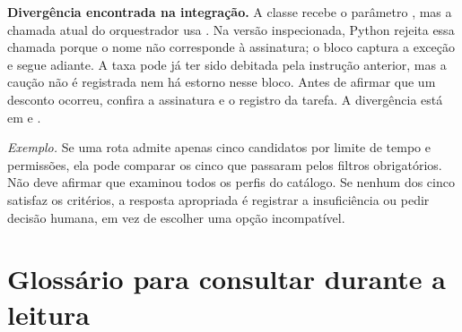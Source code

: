 \clearpage
\begin{aviso}
\textbf{Divergência encontrada na integração.} A classe
 recebe o parâmetro , mas a chamada atual do
orquestrador usa . Na versão inspecionada, Python rejeita essa
chamada porque o nome não corresponde à assinatura; o bloco captura a exceção e
segue adiante. A taxa pode já ter sido debitada pela instrução anterior, mas a
caução não é registrada nem há estorno nesse bloco. Antes de afirmar que um
desconto ocorreu, confira a assinatura e o registro da tarefa. A divergência está em
 e .
\end{aviso}

\noindent\textit{Exemplo.} Se uma rota admite apenas cinco candidatos por limite de tempo e permissões, ela pode comparar os cinco que passaram pelos filtros obrigatórios. Não deve afirmar que examinou todos os perfis do catálogo. Se nenhum dos cinco satisfaz os critérios, a resposta apropriada é registrar a insuficiência ou pedir decisão humana, em vez de escolher uma opção incompatível.

\clearpage
\section[Glossário do capítulo]{Glossário para consultar durante a leitura}

